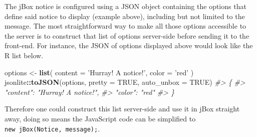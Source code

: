 \documentclass[10pt,]{krantz}
\makeatletter
\newenvironment{Shaded}{\begin{snugshade}}{\end{snugshade}}
\newcommand{\CommentTok}[1]{\textcolor[rgb]{0.37,0.37,0.37}{\textit{#1}}}
\newcommand{\DataTypeTok}[1]{\textcolor[rgb]{0.27,0.27,0.27}{#1}}
\newcommand{\KeywordTok}[1]{\textcolor[rgb]{0.27,0.27,0.27}{\textbf{#1}}}
\newcommand{\NormalTok}[1]{#1}
\newcommand{\OperatorTok}[1]{\textcolor[rgb]{0.43,0.43,0.43}{\textbf{#1}}}
\newcommand{\OtherTok}[1]{\textcolor[rgb]{0.37,0.37,0.37}{#1}}
\newcommand{\StringTok}[1]{\textcolor[rgb]{0.5,0.5,0.5}{#1}}
\newenvironment{kframe}{%
\medskip{}
\setlength{\fboxsep}{.8em}
 \def\at@end@of@kframe{}%
 \ifinner\ifhmode%
  \def\at@end@of@kframe{\end{minipage}}%
  \begin{minipage}{\columnwidth}%
 \fi\fi%
 \def\FrameCommand##1{\hskip\@totalleftmargin \hskip-\fboxsep
 \colorbox{shadecolor}{##1}\hskip-\fboxsep
     \hskip-\linewidth \hskip-\@totalleftmargin \hskip\columnwidth}%
 \MakeFramed {\advance\hsize-\width
   \@totalleftmargin\z@ \linewidth\hsize
   \@setminipage}}%
 {\par\unskip\endMakeFramed%
 \at@end@of@kframe}
\renewenvironment{Shaded}{\begin{kframe}}{\end{kframe}}
\makeatother
\begin{document}
The jBox notice is configured using a JSON object containing the options that define said notice to display (example above), including but not limited to the message. The most straightforward way to make all those options accessible to the server is to construct that list of options server-side before sending it to the front-end. For instance, the JSON of options displayed above would look like the R list below.

\begin{Shaded}
\begin{Highlighting}[]
\NormalTok{options <-}\StringTok{ }\KeywordTok{list}\NormalTok{(}
  \DataTypeTok{content =} \StringTok{'Hurray! A notice!'}\NormalTok{,}
  \DataTypeTok{color =} \StringTok{'red'}
\NormalTok{)}
\NormalTok{jsonlite}\OperatorTok{::}\KeywordTok{toJSON}\NormalTok{(options, }\DataTypeTok{pretty =} \OtherTok{TRUE}\NormalTok{, }\DataTypeTok{auto_unbox =} \OtherTok{TRUE}\NormalTok{)}
\CommentTok{#> \{}
\CommentTok{#>   "content": "Hurray! A notice!",}
\CommentTok{#>   "color": "red"}
\CommentTok{#> \}}
\end{Highlighting}
\end{Shaded}

Therefore one could construct this list server-side and use it in jBox straight away, doing so means the JavaScript code can be simplified to \texttt{new\ jBox(\textquotesingle{}Notice\textquotesingle{},\ message);}.
\end{document}
